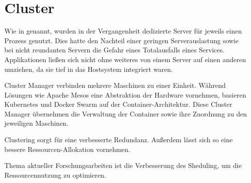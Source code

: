 \section{Cluster}
\label{sec:Cluster}
Wie in  genannt, wurden in der Vergangenheit dedizierte Server für jeweils einen Prozess genutzt.
Dies hatte den Nachteil einer geringen Serverauslastung sowie bei nicht reundanten Servern die Gefahr eines Totalausfalls eines Services.
Applikationen ließen sich nicht ohne weiteres von einem Server auf einen anderen umziehen, da sie tief in das Hostsystem integriert waren.

Cluster Manager verbinden mehrere Maschinen zu einer Einheit. Während Lösungen wie Apache Mesos eine Abstraktion der Hardware vornehmen, basieren Kubernetes und Docker Swarm auf der Container-Architektur.
Diese Cluster Manager übernehmen die Verwaltung der Container sowie ihre Zuordnung zu den jeweiligen Maschinen.

Clustering sorgt für eine verbesserte Redundanz. 
Außerdem lässt sich so eine bessere Ressourcen-Allokation vornehmen.

Thema aktueller Forschungsarbeiten ist die Verbesserung des Sheduling, um die Ressourcennutzung zu optimieren.\cite{Liu2018}

